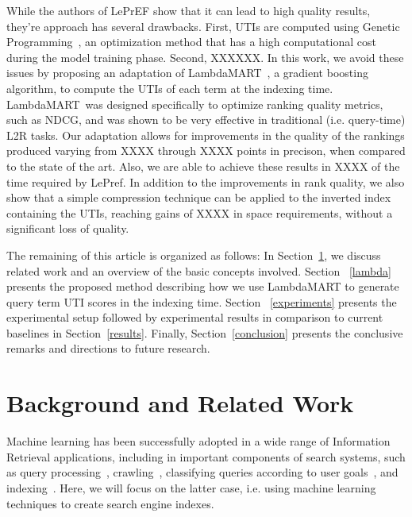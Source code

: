 \documentclass[preprint,12pt,3p]{elsarticle}
\begin{document}
\newcommand{\lambdamart}{LambdaMART}

While the authors of LePrEF show that it can lead to high quality results, they're approach has several drawbacks.  First, UTIs are computed using Genetic Programming~\cite{XXXX}, an optimization method that has a high computational cost during the model training phase. Second, XXXXXX. In this work, we avoid these issues by proposing an adaptation of \lambdamart~\cite{wu2010lambdamart}, a gradient boosting algorithm, to compute the UTIs of each term at the indexing time. \lambdamart\ was designed specifically to optimize ranking quality metrics, such as NDCG, and was shown to be very effective in traditional (i.e. query-time) L2R tasks. Our adaptation allows for improvements in the quality of the rankings produced varying from XXXX through XXXX points in precison, when compared to the state of the art. Also, we are able to achieve these results in XXXX of the time required by LePref. In addition to the improvements in rank quality, we also show that a simple compression technique can be applied to the inverted index containing the UTIs, reaching gains of XXXX in space requirements, without a significant loss of quality.

The remaining  of this article is organized as follows: In Section~\ref{relatedwork}, we discuss related work and an overview of the basic concepts involved. Section ~\ref{lambda} presents the proposed method describing how we use LambdaMART to generate query term UTI scores in the indexing time. Section ~\ref{experiments} presents the experimental setup followed by experimental results in comparison to current baselines in Section~\ref{results}. Finally, Section~\ref{conclusion} presents the conclusive remarks and directions to future research.


\section{Background and Related Work}
\label{relatedwork}

Machine learning has been successfully adopted in a wide range of Information Retrieval applications, including in important components of search systems, such as query processing~\cite{de2007combined,fan2004effects,freund2003efficient,joachims2002optimizing}, crawling~\cite{Santos2015}, classifying queries according to user goals~\cite{herrera2010exploring}, and indexing~\cite{costa2012lepref}. Here, we will focus on the latter case, i.e. using machine learning techniques to create search engine indexes.
\end{document}
